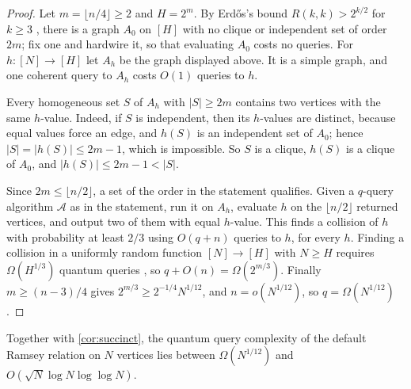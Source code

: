 \begin{proof}
Let $m=\lfloor n/4\rfloor\ge2$ and $H=2^m$.  By Erd\H{o}s's bound
$R(k,k)>2^{k/2}$ for $k\ge3$ \cite{Erdos1947}, there is a graph $A_0$ on
$[H]$ with no clique or independent set of order $2m$; fix one and hardwire
it, so that evaluating $A_0$ costs no queries.  For $h\colon[N]\to[H]$ let
$A_h$ be the graph displayed above.  It is a simple graph, and one coherent
query to $A_h$ costs $O(1)$ queries to $h$.

Every homogeneous set $S$ of $A_h$ with $|S|\ge2m$ contains two vertices
with the same $h$-value.  Indeed, if $S$ is independent, then its $h$-values
are distinct, because equal values force an edge, and $h(S)$ is an
independent set of $A_0$; hence $|S|=|h(S)|\le2m-1$, which is impossible.
So $S$ is a clique, $h(S)$ is a clique of $A_0$, and $|h(S)|\le2m-1<|S|$.

Since $2m\le\lfloor n/2\rfloor$, a set of the order in the statement
qualifies.  Given a $q$-query algorithm $\mathcal A$ as in the statement,
run it on $A_h$, evaluate $h$ on the $\lfloor n/2\rfloor$ returned
vertices, and output two of them with equal $h$-value.  This finds a
collision of $h$ with probability at least $2/3$ using $O(q+n)$ queries to
$h$, for every $h$.  Finding a collision in a uniformly random function
$[N]\to[H]$ with $N\ge H$ requires $\Omega(H^{1/3})$ quantum queries
\cite{Zhandry2015,LiuZhandry2019}, so $q+O(n)=\Omega(2^{m/3})$.  Finally
$m\ge(n-3)/4$ gives $2^{m/3}\ge2^{-1/4}N^{1/12}$, and $n=o(N^{1/12})$, so
$q=\Omega(N^{1/12})$.
\end{proof}

Together with \cref{cor:succinct}, the quantum query complexity of the
default Ramsey relation on $N$ vertices lies between $\Omega(N^{1/12})$ and
$O(\sqrt N\log N\log\log N)$.
